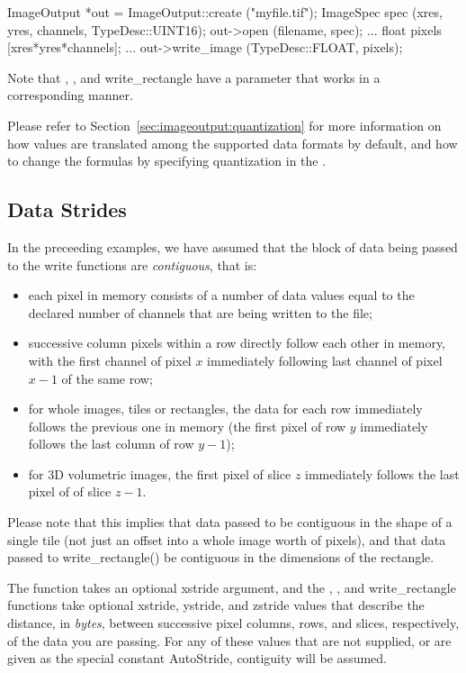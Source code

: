 \begin{code}
        ImageOutput *out = ImageOutput::create ("myfile.tif");
        ImageSpec spec (xres, yres, channels, TypeDesc::UINT16);
        out->open (filename, spec);
        ...
        float pixels [xres*yres*channels];
        ...
        out->write_image (TypeDesc::FLOAT, pixels);
\end{code}

\noindent Note that \writescanline, \writetile, and {\cf
  write_rectangle} have a parameter that works in a corresponding
manner.

Please refer to Section~\ref{sec:imageoutput:quantization} for more
information on how values are translated among the supported data
formats by default, and how to change the formulas by specifying
quantization in the \ImageSpec.


\subsection{Data Strides}
\label{sec:imageoutput:strides}

In the preceeding examples, we have assumed that the block of data being
passed to the {\cf write} functions are \emph{contiguous}, that is:

\begin{itemize}
\item each pixel in memory consists of a number of data values equal to
  the declared number of channels that are being written to the file;
\item successive column pixels within a row directly follow each other in
  memory, with the first channel of pixel $x$ immediately following
  last channel of pixel $x-1$ of the same row;
\item for whole images, tiles or rectangles, the data for each row
  immediately follows the previous one in memory (the first pixel of row
  $y$ immediately follows the last column of row $y-1$);
\item for 3D volumetric images, the first pixel of slice $z$ immediately
  follows the last pixel of of slice $z-1$.
\end{itemize}

Please note that this implies that data passed to
\writetile be contiguous in the shape of a single tile (not just an
offset into a whole image worth of pixels), and that data passed to {\cf
  write_rectangle()} be contiguous in the dimensions of the rectangle.

The \writescanline function takes an optional {\cf xstride} argument,
and the \writeimage, \writetile, and {\cf write_rectangle} functions
take optional {\cf xstride}, {\cf ystride}, and {\cf zstride} values
that describe the distance, in \emph{bytes}, between successive pixel
columns, rows, and slices, respectively, of the data you are passing.
For any of these values that are not supplied, or are given as the
special constant {\cf AutoStride}, contiguity will be assumed.

